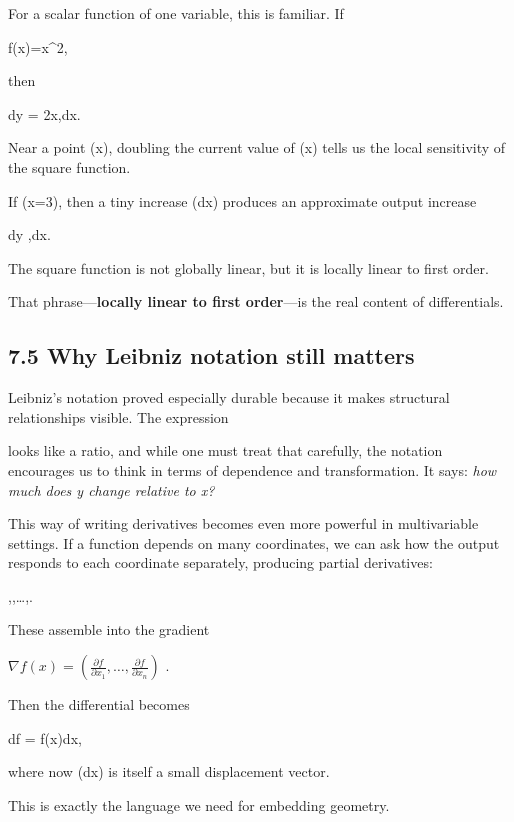 \documentclass[
]{article}
\begin{document}
For a scalar function of one variable, this is familiar. If

f(x)=x\^{}2,

then

dy = 2x,dx.

Near a point (x), doubling the current value of (x) tells us the local
sensitivity of the square function.

If (x=3), then a tiny increase (dx) produces an approximate output
increase

dy ,dx.

The square function is not globally linear, but it is locally linear to
first order.

That phrase---\textbf{locally linear to first order}---is the real
content of differentials.

\hypertarget{why-leibniz-notation-still-matters}{%
\subsection{7.5 Why Leibniz notation still
matters}\label{why-leibniz-notation-still-matters}}

Leibniz's notation proved especially durable because it makes structural
relationships visible. The expression


looks like a ratio, and while one must treat that carefully, the
notation encourages us to think in terms of dependence and
transformation. It says: \emph{how much does y change relative to x?}

This way of writing derivatives becomes even more powerful in
multivariable settings. If a function depends on many coordinates, we
can ask how the output responds to each coordinate separately, producing
partial derivatives:

,\quad {},\quad \dots,\quad {}.

These assemble into the gradient

\(\nabla f(x)=\left(\frac{\partial f}{\partial x_1},\dots,\frac{\partial f}{\partial x_n}\right)\)
.

Then the differential becomes

df = \nabla f(x)\cdot dx,

where now (dx) is itself a small displacement vector.

This is exactly the language we need for embedding geometry.
\end{document}
